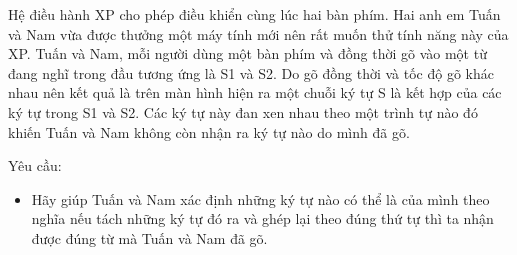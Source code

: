 Hệ điều hành XP cho phép điều khiển cùng lúc hai bàn phím. Hai anh em Tuấn và Nam vừa được thưởng một máy tính mới nên rất muốn thử tính năng này của XP. Tuấn và Nam, mỗi người dùng một bàn phím và đồng thời gõ vào một từ đang nghĩ trong đầu tương ứng là S1 và S2. Do gõ đồng thời và tốc độ gõ khác nhau nên kết quả là trên màn hình hiện ra một chuỗi ký tự S là kết hợp của các ký tự trong S1 và S2. Các ký tự này đan xen nhau theo một trình tự nào đó khiến Tuấn và Nam không còn nhận ra ký tự nào do mình đã gõ.  

Yêu cầu:
\begin{itemize}
	\item     Hãy giúp Tuấn và Nam xác định những ký tự nào có thể  là của mình theo nghĩa nếu tách những ký tự đó ra và ghép lại theo đúng thứ tự thì ta nhận được đúng từ mà Tuấn và Nam đã gõ.   
\end{itemize}